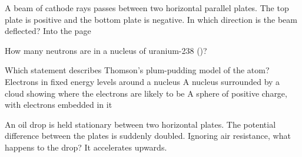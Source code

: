\begin{quizq}{}
A beam of cathode rays passes between two horizontal parallel plates. The top plate is positive and the
bottom plate is negative. In which direction is the beam deflected?
  {Into the page}
\end{quizq}

\begin{quizq}{}
How many neutrons are in a nucleus of uranium-238 ()?
\end{quizq}

\begin{quizq}{}
Which statement describes Thomson's plum-pudding model of the atom?
  {Electrons in fixed energy levels around a nucleus}
  {A nucleus surrounded by a cloud showing where the electrons are likely to be}
  {A sphere of positive charge, with electrons embedded in it}
\end{quizq}

\begin{quizq}{}
An oil drop is held stationary between two horizontal plates. The potential difference between the
plates is suddenly doubled. Ignoring air resistance, what happens to the drop?
  {It accelerates upwards.}
\end{quizq}
